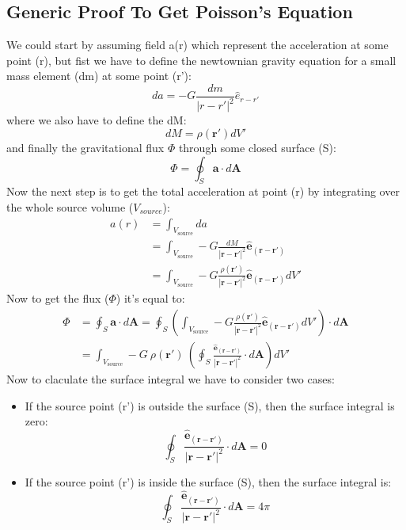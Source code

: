 \documentclass[11pt, a4paper]{report}
\begin{document}
\subsection*{Generic Proof To Get Poisson's Equation}
We could start by assuming field a(r) which represent the acceleration at some point (r), but fist we have to define the newtownian gravity equation for a small mass element (dm) at some point (r'):
\begin{equation}\label{eq:acc-dm}
da = - G \frac{dm}{|r - r'|^2} \hat{e}_{r-r'} 
\end{equation}
where we also have to define the dM:  
\begin{equation}\label{eq:dm_rho}
dM = \rho(\mathbf{r}') dV'
\end{equation}
and finally the gravitational flux  $\Phi$ through some closed surface (S):
\begin{equation}\label{eq:flux}
    \Phi = \oint_S \mathbf{a} \cdot d\mathbf{A}
\end{equation}
\newline
Now the next step is to get the total acceleration at point (r) by integrating over the whole source volume ($V_{source}$):
\begin{align*}
    a(r) &= \int_{V_{\text{source}}} da \\
    &=\int_{V_{\text{source}}} -G \frac{dM}{|\mathbf{r}-\mathbf{r}'|^2} \hat{\mathbf{e}}_{(\mathbf{r}-\mathbf{r}')} \\
    &= \int_{V_{\text{source}}} -G \frac{\rho(\mathbf{r}')}{|\mathbf{r}-\mathbf{r}'|^2} \hat{\mathbf{e}}_{(\mathbf{r}-\mathbf{r}')} dV'
\end{align*} 
Now to get the flux ($\Phi$) it's equal to:
\begin{align*}
    \Phi &= \oint_S \mathbf{a} \cdot d\mathbf{A} = \oint_S \left( \int_{V_{\text{source}}} -G \frac{\rho(\mathbf{r}')}{|\mathbf{r}-\mathbf{r}'|^2} \hat{\mathbf{e}}_{(\mathbf{r}-\mathbf{r}')} dV' \right) \cdot d\mathbf{A} \\
    &= \int_{V_{\text{source}}} -G \ \rho(\mathbf{r}')  \ \left(\oint_S  \frac{\hat{\mathbf{e}}_{(\mathbf{r}-\mathbf{r}')}}{|\mathbf{r}-\mathbf{r}'|^2}  \cdot d\mathbf{A} \right) dV'
\end{align*}
Now to claculate the surface integral we have to consider two cases:
\begin{itemize}
    \item If the source point (r') is outside the surface (S), then the surface integral is zero:
    $$\oint_S  \frac{\hat{\mathbf{e}}_{(\mathbf{r}-\mathbf{r}')}}{|\mathbf{r}-\mathbf{r}'|^2}  \cdot d\mathbf{A} = 0 $$
    \item If the source point (r') is inside the surface (S), then the surface integral is:
    $$\oint_S  \frac{\hat{\mathbf{e}}_{(\mathbf{r}-\mathbf{r}')}}{|\mathbf{r}-\mathbf{r}'|^2}  \cdot d\mathbf{A} = 4 \pi $$
\end{itemize}
\end{document}
